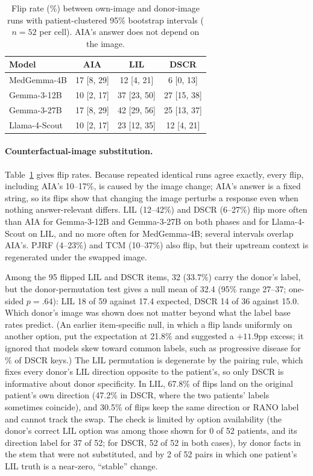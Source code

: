 \documentclass[11pt]{article}
\begin{document}
\begin{table}[t]
\centering
\footnotesize
\setlength{\tabcolsep}{3pt}
\begin{tabular}{lccc}
\toprule
Model & AIA & LIL & DSCR \\
\midrule
MedGemma-4B & 17 [8, 29] & 12 [4, 21] & 6 [0, 13] \\
Gemma-3-12B & 10 [2, 17] & 37 [23, 50] & 27 [15, 38] \\
Gemma-3-27B & 17 [8, 29] & 42 [29, 56] & 25 [13, 37] \\
Llama-4-Scout & 10 [2, 17] & 23 [12, 35] & 12 [4, 21] \\
\bottomrule
\end{tabular}
\caption{Flip rate (\%) between own-image and donor-image runs with patient-clustered 95\% bootstrap intervals ($n=52$ per cell). AIA's answer does not depend on the image.}
\label{tab:flip}
\end{table}

\paragraph{Counterfactual-image substitution.} Table~\ref{tab:flip} gives flip rates. Because repeated identical runs agree exactly, every flip, including AIA's 10--17\%, is caused by the image change; AIA's answer is a fixed string, so its flips show that changing the image perturbs a response even when nothing answer-relevant differs. LIL (12--42\%) and DSCR (6--27\%) flip more often than AIA for Gemma-3-12B and Gemma-3-27B on both phases and for Llama-4-Scout on LIL, and no more often for MedGemma-4B; several intervals overlap AIA's. PJRF (4--23\%) and TCM (10--37\%) also flip, but their upstream context is regenerated under the swapped image.

Among the 95 flipped LIL and DSCR items, 32 (33.7\%) carry the donor's label, but the donor-permutation test gives a null mean of 32.4 (95\% range 27--37; one-sided $p=.64$): LIL 18 of 59 against 17.4 expected, DSCR 14 of 36 against 15.0. Which donor's image was shown does not matter beyond what the label base rates predict. (An earlier item-specific null, in which a flip lands uniformly on another option, put the expectation at 21.8\% and suggested a $+11.9$pp excess; it ignored that models skew toward common labels, such as progressive disease for \dscrMajorityPct{}\% of DSCR keys.) The LIL permutation is degenerate by the pairing rule, which fixes every donor's LIL direction opposite to the patient's, so only DSCR is informative about donor specificity. In LIL, 67.8\% of flips land on the original patient's own direction (47.2\% in DSCR, where the two patients' labels sometimes coincide), and 30.5\% of flips keep the same direction or RANO label and cannot track the swap. The check is limited by option availability (the donor's correct LIL option was among those shown for 0 of 52 patients, and its direction label for 37 of 52; for DSCR, 52 of 52 in both cases), by donor facts in the stem that were not substituted, and by 2 of 52 pairs in which one patient's LIL truth is a near-zero, ``stable'' change.
\end{document}
